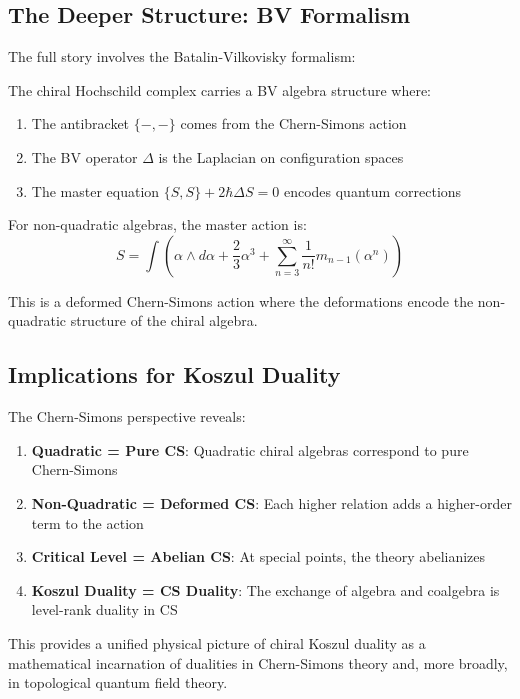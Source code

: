 \subsection{The Deeper Structure: BV Formalism}

The full story involves the Batalin-Vilkovisky formalism:

\begin{theorem}[BV Structure]
The chiral Hochschild complex carries a BV algebra structure where:
\begin{enumerate}
\item The antibracket $\{-,-\}$ comes from the Chern-Simons action
\item The BV operator $\Delta$ is the Laplacian on configuration spaces
\item The master equation $\{S, S\} + 2\hbar\Delta S = 0$ encodes quantum corrections
\end{enumerate}
\end{theorem}

For non-quadratic algebras, the master action is:
\[
S = \int \left(\alpha \wedge d\alpha + \frac{2}{3}\alpha^3 + \sum_{n=3}^{\infty} \frac{1}{n!}m_{n-1}(\alpha^n)\right)
\]

This is a deformed Chern-Simons action where the deformations encode the non-quadratic structure of the chiral algebra.

\subsection{Implications for Koszul Duality}

The Chern-Simons perspective reveals:

\begin{enumerate}
\item \textbf{Quadratic = Pure CS}: Quadratic chiral algebras correspond to pure Chern-Simons
\item \textbf{Non-Quadratic = Deformed CS}: Each higher relation adds a higher-order term to the action
\item \textbf{Critical Level = Abelian CS}: At special points, the theory abelianizes
\item \textbf{Koszul Duality = CS Duality}: The exchange of algebra and coalgebra is level-rank duality in CS
\end{enumerate}

This provides a unified physical picture of chiral Koszul duality as a mathematical incarnation of dualities in Chern-Simons theory and, more broadly, in topological quantum field theory.

